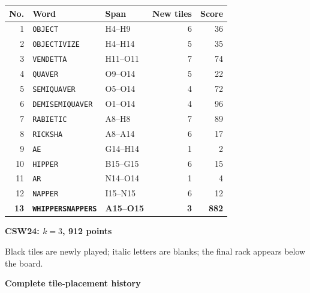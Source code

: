 \documentclass[letterpaper]{article}
\begin{document}
\begin{center}
\fontsize{8.5}{8.8}\selectfont
\setlength{\tabcolsep}{4pt}
\renewcommand{\arraystretch}{0.90}
\begin{tabular}{@{}rllrr@{}}\toprule
No. & Word & Span & New tiles & Score\\
\midrule
1 & \texttt{OBJECT} & H4--H9 & 6 & 36\\
2 & \texttt{OBJECTIVIZE} & H4--H14 & 5 & 35\\
3 & \texttt{VENDETTA} & H11--O11 & 7 & 74\\
4 & \texttt{QUAVER} & O9--O14 & 5 & 22\\
5 & \texttt{SEMIQUAVER} & O5--O14 & 4 & 72\\
6 & \texttt{DEMISEMIQUAVER} & O1--O14 & 4 & 96\\
7 & \texttt{RABIETIC} & A8--H8 & 7 & 89\\
8 & \texttt{RICKSHA} & A8--A14 & 6 & 17\\
9 & \texttt{AE} & G14--H14 & 1 & 2\\
10 & \texttt{HIPPER} & B15--G15 & 6 & 15\\
11 & \texttt{AR} & N14--O14 & 1 & 4\\
12 & \texttt{NAPPER} & I15--N15 & 6 & 12\\
\midrule
\textbf{13} & \textbf{\texttt{WHIPPERSNAPPERS}} & \textbf{A15--O15} & \textbf{3} & \textbf{882}\\
\bottomrule\end{tabular}
\end{center}
\vfill
\clearpage
\begin{center}
{\fontsize{11}{12}\selectfont\bfseries CSW24: $k=3$, 912 points\par}
\vspace{2pt}
\par
\vspace{1pt}
{\fontsize{7.2}{8}\selectfont Black tiles are newly played; italic letters are blanks; the final rack appears below the board.\par}
\vspace{2pt}
{\fontsize{8.5}{9}\selectfont\bfseries Complete tile-placement history\par}
\end{center}
\end{document}
